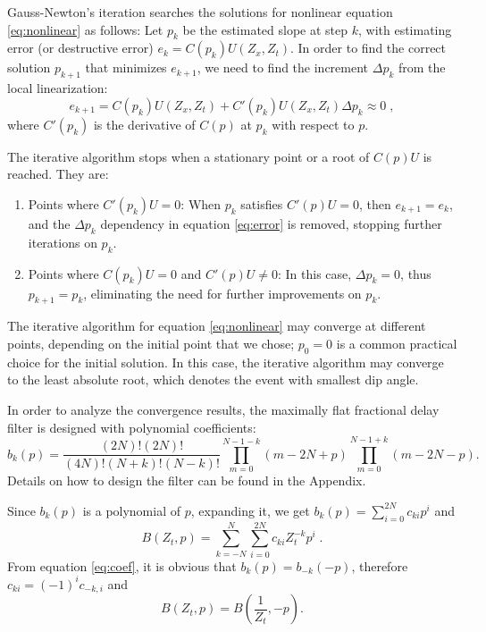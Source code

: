 Gauss-Newton's iteration searches the solutions for nonlinear equation 
\ref{eq:nonlinear} as follows:
Let $p_k$ be the estimated slope at step $k$,
with estimating error (or destructive error) $e_k=C(p_k)U(Z_x,Z_t)$.
In order to find the correct solution $p_{k+1}$ that minimizes $e_{k+1} $,
we need to find the increment $\Delta p_k$ from the local linearization:
\begin{equation}\label{eq:error}
e_{k+1} = C(p_k)U(Z_x,Z_t)+C'(p_k)U(Z_x,Z_t)\Delta p_k \approx 0\;,
\end{equation} 
where $C'(p_k)$ is the derivative of $C(p)$ at $p_k$ 
with respect to $p$.

The iterative algorithm stops when a stationary point
or a root of $C(p)U$ is reached. They are:
\begin{enumerate}
\item 
Points where $C'(p_k)U=0$:
When $p_k$ satisfies $C'(p)U=0$, then $e_{k+1}=e_k$,
and the $\Delta p_k$ dependency in equation \ref{eq:error} is removed,
stopping further iterations on $p_k$.
\item 
Points where $C(p_k)U=0$ and $C'(p)U\neq 0$:
In this case, $\Delta p_k=0$, thus $p_{k+1}=p_k$,
eliminating the need for further improvements on $p_k$.
\end{enumerate}


The iterative algorithm for equation \ref{eq:nonlinear}
may converge at different points,
depending on the initial point that we chose;
$p_0=0$ is a common practical choice for the initial solution.
In this case, 
the iterative algorithm may converge to the least absolute root, 
which denotes the event with smallest dip angle.

In order to analyze the convergence results,
the maximally flat fractional delay filter 
\cite[]{thiran1971recursive,zhang2009maxflat}
is designed with polynomial coefficients:
\begin{equation}\label{eq:coef}
b_k(p)=
\frac{(2N)!(2N)!}{(4N)!(N+k)!(N-k)!}
\prod_{m=0}^{N-1-k}(m-2N+p)
\prod_{m=0}^{N-1+k}(m-2N-p).
\end{equation}
Details on how to design the filter can be found in the Appendix.


Since $b_k(p)$ is a polynomial of $p$,
expanding it, we get $b_k(p)=\displaystyle{\sum_{i=0}^{2N}c_{ki}p^i}$ and 
\begin{equation}
B(Z_t,p)=\sum_{k=-N}^N\sum_{i=0}^{2N}c_{ki}Z_t^{-k}p^i\;.
\end{equation}
From equation \ref{eq:coef}, it is obvious that $b_k(p)=b_{-k}(-p)$, 
therefore
$c_{ki}=(-1)^ic_{-k,i}$ and
\begin{equation}
B(Z_t,p)=B(\frac{1}{Z_t},-p).
\end{equation}

